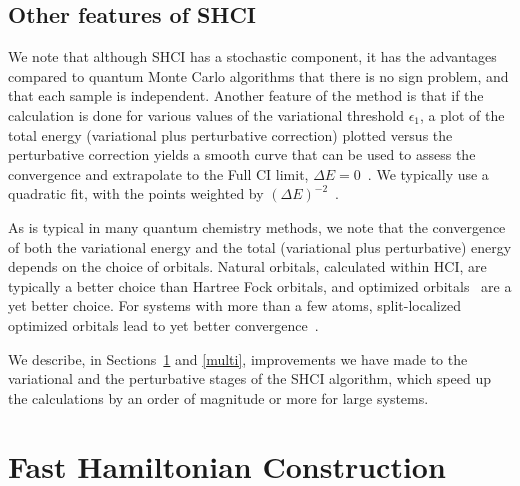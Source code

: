 \documentclass[%
reprint,
 superscriptaddress,
 amsmath,amssymb,
 aps,
]{revtex4-1}
\begin{document}
\subsection{Other features of SHCI}
\label{other_features}
We note that although SHCI has a stochastic component, it has the advantages compared to quantum Monte Carlo algorithms that there is no sign problem,
and that each sample is independent.
Another feature of the method is that if the calculation is done for various values of the variational threshold $\epsilon_1$,
a plot of the total energy (variational plus perturbative correction) plotted versus the perturbative correction yields a smooth curve that can be used to assess the convergence and extrapolate to the Full CI limit,  $\Delta E=0$~\cite{HolUmrSha-JCP-17}.
We typically use a quadratic fit, with the points weighted by $\left(\Delta E\right)^{-2}$~\cite{ChiHolOttUmrShaZim-JPCA-18}.

As is typical in many quantum chemistry methods, we note that the convergence of both the variational energy and the total (variational plus perturbative) energy
depends on the choice of orbitals.  Natural orbitals, calculated within HCI, are typically a better choice than Hartree Fock orbitals,
and optimized orbitals~\cite{SmiMusHolSha-JCTC-17} are a yet better choice.  For systems with more than a few atoms,
split-localized optimized orbitals lead to yet better convergence~\cite{ChiHolOttUmrShaZim-JPCA-18}.

We describe, in Sections~\ref{fast} and \ref{multi}, improvements we have made to the variational and the perturbative stages of the SHCI algorithm,
which speed up the calculations by an order of magnitude or more for large systems.

\section{Fast Hamiltonian Construction}
\label{fast}
\end{document}
